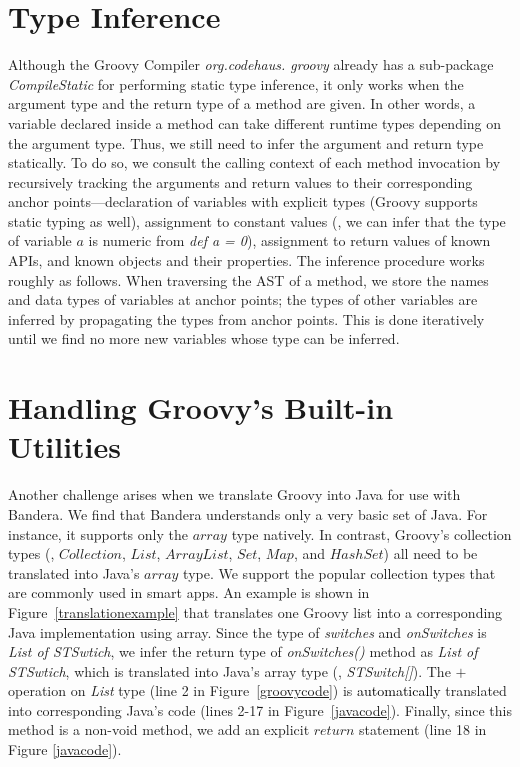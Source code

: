 \section{Type Inference}
Although the Groovy Compiler \textit{org.codehaus. groovy} already has a sub-package \textit{CompileStatic} for performing static type inference,
it only works when the argument type and the return type of a method are given.
In other words, a variable declared inside a method can take different runtime types depending on the argument type.
Thus, we still need to infer the argument and return type statically.
To do so, we consult the calling context of each method invocation
by recursively tracking the arguments and return values to their corresponding
anchor points---declaration of variables with explicit types (Groovy supports static typing as well),
assignment to constant values
(\eg, we can infer that the type of variable $a$ is numeric from \textit{def a = 0}),
assignment to return values of known APIs, and known objects and their properties.
The inference procedure works roughly as follows.
When traversing the AST of a method, we store the names and data types of variables at anchor points;
the types of other variables are inferred by propagating the types from anchor points.
This is done iteratively until we find no more new variables whose type can be inferred.


\section{Handling Groovy's Built-in Utilities}
Another challenge arises when we translate Groovy into Java for use with Bandera.
We find that Bandera understands only a very basic set of Java.
For instance, it supports only the $array$ type natively.
In contrast, Groovy's collection types (\eg, $Collection$, $List$, $ArrayList$, $Set$, $Map$, and $HashSet$)
all need to be translated into Java's $array$ type.
We support the popular collection types that are commonly used in smart apps.
An example is shown in Figure~\ref{translationexample} that translates one Groovy list into a corresponding Java implementation using array.
Since the type of \textit{switches} and \textit{onSwitches} is \textit{List of STSwtich},
we infer the return type of \textit{onSwitches()} method as \textit{List of STSwtich},
which is translated into Java's array type (\ie, \textit{STSwitch[]}).
The $+$ operation on \textit{List} type (line 2 in Figure~\ref{groovycode}) is
\textcolor{black}{automatically} translated into corresponding Java's code
(lines 2-17 in Figure~\ref{javacode}).
Finally, since this method is a non-void method,
we add an explicit $return$ statement (line 18 in Figure \ref{javacode}).





